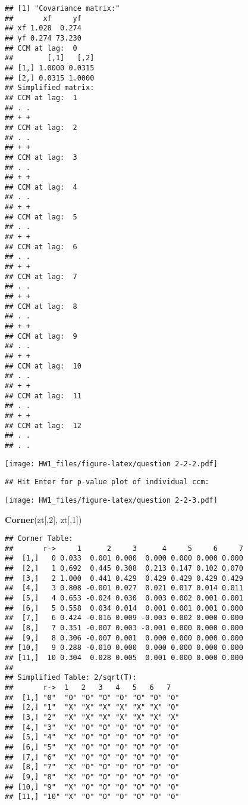 \documentclass[]{article}
\newenvironment{Shaded}{\begin{snugshade}}{\end{snugshade}}
\newcommand{\KeywordTok}[1]{\textcolor[rgb]{0.13,0.29,0.53}{\textbf{#1}}}
\newcommand{\DecValTok}[1]{\textcolor[rgb]{0.00,0.00,0.81}{#1}}
\newcommand{\NormalTok}[1]{#1}
\begin{document}
\begin{verbatim}
## [1] "Covariance matrix:"
##       xf     yf
## xf 1.028  0.274
## yf 0.274 73.230
## CCM at lag:  0 
##        [,1]   [,2]
## [1,] 1.0000 0.0315
## [2,] 0.0315 1.0000
## Simplified matrix: 
## CCM at lag:  1 
## . . 
## + + 
## CCM at lag:  2 
## . . 
## + + 
## CCM at lag:  3 
## . . 
## + + 
## CCM at lag:  4 
## . . 
## + + 
## CCM at lag:  5 
## . . 
## + + 
## CCM at lag:  6 
## . . 
## + + 
## CCM at lag:  7 
## . . 
## + + 
## CCM at lag:  8 
## . . 
## + + 
## CCM at lag:  9 
## . . 
## + + 
## CCM at lag:  10 
## . . 
## + + 
## CCM at lag:  11 
## . . 
## + + 
## CCM at lag:  12 
## . . 
## . .
\end{verbatim}

\texttt{[image: HW1\_files/figure-latex/question 2-2-2.pdf]}

\begin{verbatim}
## Hit Enter for p-value plot of individual ccm:
\end{verbatim}

\texttt{[image: HW1\_files/figure-latex/question 2-2-3.pdf]}

\begin{Shaded}
\begin{Highlighting}[]
\KeywordTok{Corner}\NormalTok{(zt[,}\DecValTok{2}\NormalTok{], zt[,}\DecValTok{1}\NormalTok{])}
\end{Highlighting}
\end{Shaded}

\begin{verbatim}
## Corner Table:  
##       r->     1      2     3      4     5     6     7
##  [1,]   0 0.033  0.001 0.000  0.000 0.000 0.000 0.000
##  [2,]   1 0.692  0.445 0.308  0.213 0.147 0.102 0.070
##  [3,]   2 1.000  0.441 0.429  0.429 0.429 0.429 0.429
##  [4,]   3 0.808 -0.001 0.027  0.021 0.017 0.014 0.011
##  [5,]   4 0.653 -0.024 0.030  0.003 0.002 0.001 0.001
##  [6,]   5 0.558  0.034 0.014  0.001 0.001 0.001 0.000
##  [7,]   6 0.424 -0.016 0.009 -0.003 0.002 0.000 0.000
##  [8,]   7 0.351 -0.007 0.003 -0.001 0.000 0.000 0.000
##  [9,]   8 0.306 -0.007 0.001  0.000 0.000 0.000 0.000
## [10,]   9 0.288 -0.010 0.000  0.000 0.000 0.000 0.000
## [11,]  10 0.304  0.028 0.005  0.001 0.000 0.000 0.000
## 
## Simplified Table: 2/sqrt(T):  
##       r->  1   2   3   4   5   6   7  
##  [1,] "0"  "O" "O" "O" "O" "O" "O" "O"
##  [2,] "1"  "X" "X" "X" "X" "X" "X" "O"
##  [3,] "2"  "X" "X" "X" "X" "X" "X" "X"
##  [4,] "3"  "X" "O" "O" "O" "O" "O" "O"
##  [5,] "4"  "X" "O" "O" "O" "O" "O" "O"
##  [6,] "5"  "X" "O" "O" "O" "O" "O" "O"
##  [7,] "6"  "X" "O" "O" "O" "O" "O" "O"
##  [8,] "7"  "X" "O" "O" "O" "O" "O" "O"
##  [9,] "8"  "X" "O" "O" "O" "O" "O" "O"
## [10,] "9"  "X" "O" "O" "O" "O" "O" "O"
## [11,] "10" "X" "O" "O" "O" "O" "O" "O"
\end{verbatim}
\end{document}

